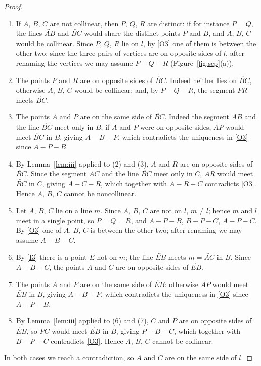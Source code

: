 \documentclass[11pt]{amsart}
\theoremstyle{definition}
\theoremstyle{remark}
\begin{document}
\begin{proof}
\begin{enumerate}[label=(\arabic*)]
\item If $A$, $B$, $C$ are not collinear, then $P$, $Q$, $R$ are distinct: if for instance $P=Q$, the lines $\overleftrightarrow{AB}$ and $\overleftrightarrow{BC}$ would share the distinct points $P$ and $B$, and $A$, $B$, $C$ would be collinear. Since $P$, $Q$, $R$ lie on $l$, by \ref{O3} one of them is between the other two; since the three pairs of vertices are on opposite sides of $l$, after renaming the vertices we may assume $P-Q-R$ (Figure~\ref{fig:sep}(a)).
\item The points $P$ and $R$ are on opposite sides of $\overleftrightarrow{BC}$. Indeed neither lies on $\overleftrightarrow{BC}$, otherwise $A$, $B$, $C$ would be collinear; and, by $P-Q-R$, the segment $PR$ meets $\overleftrightarrow{BC}$.
\item The points $A$ and $P$ are on the same side of $\overleftrightarrow{BC}$. Indeed the segment $AB$ and the line $\overleftrightarrow{BC}$ meet only in $B$; if $A$ and $P$ were on opposite sides, $AP$ would meet $\overleftrightarrow{BC}$ in $B$, giving $A-B-P$, which contradicts the uniqueness in \ref{O3} since $A-P-B$.
\item By Lemma~\ref{lem:iii} applied to (2) and (3), $A$ and $R$ are on opposite sides of $\overleftrightarrow{BC}$. Since the segment $AC$ and the line $\overleftrightarrow{BC}$ meet only in $C$, $AR$ would meet $\overleftrightarrow{BC}$ in $C$, giving $A-C-R$, which together with $A-R-C$ contradicts \ref{O3}. Hence $A$, $B$, $C$ cannot be noncollinear.
\item Let $A$, $B$, $C$ lie on a line $m$. Since $A$, $B$, $C$ are not on $l$, $m\neq l$; hence $m$ and $l$ meet in a single point, so $P=Q=R$, and $A-P-B$, $B-P-C$, $A-P-C$. By \ref{O3} one of $A$, $B$, $C$ is between the other two; after renaming we may assume $A-B-C$.
\item By \ref{I3} there is a point $E$ not on $m$; the line $\overleftrightarrow{EB}$ meets $m=\overleftrightarrow{AC}$ in $B$. Since $A-B-C$, the points $A$ and $C$ are on opposite sides of $\overleftrightarrow{EB}$.
\item The points $A$ and $P$ are on the same side of $\overleftrightarrow{EB}$: otherwise $AP$ would meet $\overleftrightarrow{EB}$ in $B$, giving $A-B-P$, which contradicts the uniqueness in \ref{O3} since $A-P-B$.
\item By Lemma~\ref{lem:iii} applied to (6) and (7), $C$ and $P$ are on opposite sides of $\overleftrightarrow{EB}$, so $PC$ would meet $\overleftrightarrow{EB}$ in $B$, giving $P-B-C$, which together with $B-P-C$ contradicts \ref{O3}. Hence $A$, $B$, $C$ cannot be collinear.
\end{enumerate}
In both cases we reach a contradiction, so $A$ and $C$ are on the same side of $l$.
\end{proof}
\end{document}
